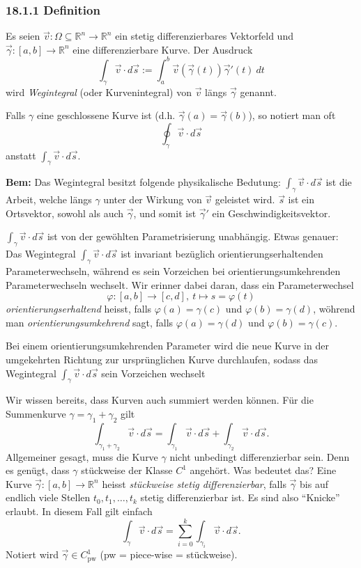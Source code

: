 \documentclass[a4paper,landscape,8pt]{extarticle}
\newcommand{\R}{\mathbb{R}}
\newcommand{\Bem}{\textbf{Bem: }}
\begin{document}
\begin{multicols*}{4}
\subsubsection{18.1.1 Definition}

\Def Es seien $\vec{v}\colon\Omega\subseteq\R^n\to\R^n$ ein stetig
differenzierbares Vektorfeld und $\vec{\gamma}\colon[a,b]\to\R^n$ eine
differenzierbare Kurve. Der Ausdruck
\[
\int_\gamma \vec{v}\cdot d\vec{s} := \int_a^b
\vec{v}(\vec{\gamma}(t))\vec{\gamma}'(t) \ dt
\]
wird \emph{Wegintegral} (oder Kurvenintegral) von $\vec{v}$ längs $\vec{\gamma}$
genannt.

Falls $\gamma$ eine geschlossene Kurve ist (d.h. $\vec{\gamma}(a) =
\vec{\gamma}(b)$), so notiert man oft
\[
\oint_\gamma \vec{v}\cdot d\vec{s}
\]
anstatt $\int_\gamma \vec{v}\cdot d\vec{s}$.

\Bem Das Wegintegral besitzt folgende physikalische Bedutung: $\int_\gamma
\vec{v}\cdot d\vec{s}$ ist die Arbeit, welche längs $\gamma$ unter der Wirkung
von $\vec{v}$ geleistet wird. $\vec{s}$ ist ein Ortsvektor, sowohl als auch
$\vec{\gamma}$, und somit ist $\vec{\gamma}'$ ein Geschwindigkeitsvektor.

\Satz $\int_\gamma \vec{v}\cdot d\vec{s}$ ist von der gewöhlten Parametrisierung
unabhängig. Etwas genauer: Das Wegintegral $\int_\gamma \vec{v}\cdot d\vec{s}$
ist invariant bezüglich orientierungserhaltenden Parameterwechseln, während es
sein Vorzeichen bei orientierungsumkehrenden Parameterwechseln wechselt. Wir
erinner dabei daran, dass ein Parameterwechsel
\[
\varphi\colon  [a,b]\to[c,d],\ t\mapsto s = \varphi(t)
\]
\emph{orientierungserhaltend} heisst, falls $\varphi(a) = \gamma(c)$ und
$\varphi(b)=\gamma(d)$, wöhrend man \emph{orientierungsumkehrend} sagt, falls
$\varphi(a)=\gamma(d)$ und $\varphi(b) = \gamma(c)$.

Bei einem orientierungsumkehrenden Parameter wird die neue Kurve in der
umgekehrten Richtung zur ursprünglichen Kurve durchlaufen, sodass das
Wegintegral $\int_\gamma\vec{v}\cdot d\vec{s}$ sein Vorzeichen wechselt

\Satz Wir wissen bereits, dass Kurven auch summiert werden können. Für die
Summenkurve $\gamma = \gamma_1 + \gamma_2$ gilt
\[
\int_{\gamma_1+\gamma_2} \vec{v}\cdot d\vec{s}
=
\int_{\gamma_1} \vec{v}\cdot d\vec{s}
+
\int_{\gamma_2} \vec{v}\cdot d\vec{s}.
\]
Allgemeiner gesagt, muss die Kurve $\gamma$ nicht unbedingt differenzierbar
sein. Denn es genügt, dass $\gamma$ stückweise der Klasse $C^1$ angehört. Was
bedeutet das? Eine Kurve $\vec{\gamma}\colon[a,b]\to\R^n$ heisst
\emph{stückweise stetig differenzierbar}, falls $\vec{\gamma}$ bis auf endlich
viele Stellen $t_0,t_1,\ldots,t_k$ stetig differenzierbar ist. Es sind also
``Knicke'' erlaubt. In diesem Fall gilt einfach
\[
\int_\gamma \vec{v} \cdot d\vec{s} =
\sum_{i=0}^k \int_{\gamma_i} \vec{v}\cdot d\vec{s}.
\]
Notiert wird $\vec{\gamma}\in C^1_{\text{pw}}$ (pw = piece-wise = stückweise).


\end{multicols*}
\end{document}
